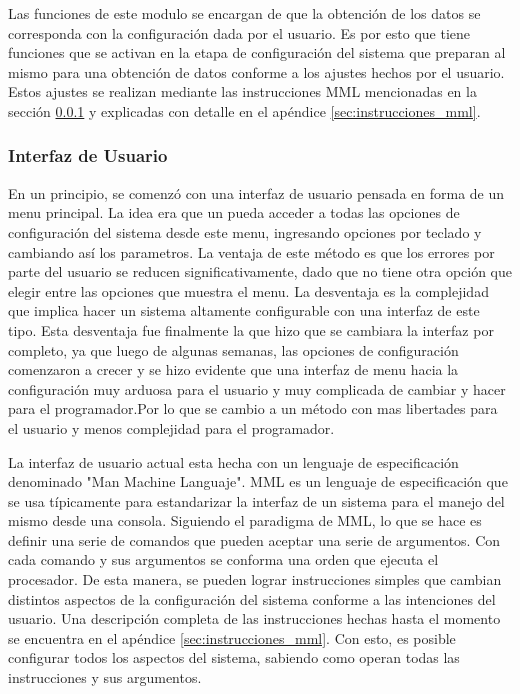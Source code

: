 \documentclass{article}
\theoremstyle{definition}
\theoremstyle{remark}
\begin{document}
Las funciones de este modulo se encargan de que la obtención de los datos se corresponda con la configuración dada por el usuario. Es por esto que tiene funciones que se activan en la etapa de configuración del sistema que preparan al mismo para una obtención de datos conforme a los ajustes hechos por el usuario. Estos ajustes se realizan mediante las instrucciones MML mencionadas en la sección \ref{ssub:interfaz_de_usuario} y explicadas con detalle en el apéndice \ref{sec:instrucciones_mml}.


\subsubsection{Interfaz de Usuario} %
\label{ssub:interfaz_de_usuario}

En un principio, se comenzó con una interfaz de usuario pensada en forma de un menu principal. La idea era que un pueda acceder a todas las opciones de configuración del sistema desde este menu, ingresando opciones por teclado y cambiando así los parametros. La ventaja de este método es que los errores por parte del usuario se reducen significativamente, dado que no tiene otra opción que elegir entre las opciones que muestra el menu. La desventaja es la complejidad que implica hacer un sistema altamente configurable con una interfaz de este tipo. Esta desventaja fue finalmente la que hizo que se cambiara la interfaz por completo, ya que luego de algunas semanas, las opciones de configuración comenzaron a crecer y se hizo evidente que una interfaz de menu hacia la configuración muy arduosa para el usuario y muy complicada de cambiar y hacer para el programador.Por lo que se cambio a un método con mas libertades para el usuario y menos complejidad para el programador.

La interfaz de usuario actual esta hecha con un lenguaje de especificación denominado "Man Machine Languaje". MML es un lenguaje de especificación que se usa típicamente para estandarizar la interfaz de un sistema para el manejo del mismo desde una consola. Siguiendo el paradigma de MML, lo que se hace es definir una serie de comandos que pueden aceptar una serie de argumentos. Con cada comando y sus argumentos se conforma una orden que ejecuta el procesador. De esta manera, se pueden lograr instrucciones simples que cambian distintos aspectos de la configuración del sistema conforme a las intenciones del usuario. Una descripción completa de las instrucciones hechas hasta el momento se encuentra en el apéndice \ref{sec:instrucciones_mml}. Con esto, es posible configurar todos los aspectos del sistema, sabiendo como operan todas las instrucciones y sus argumentos.
\end{document}
